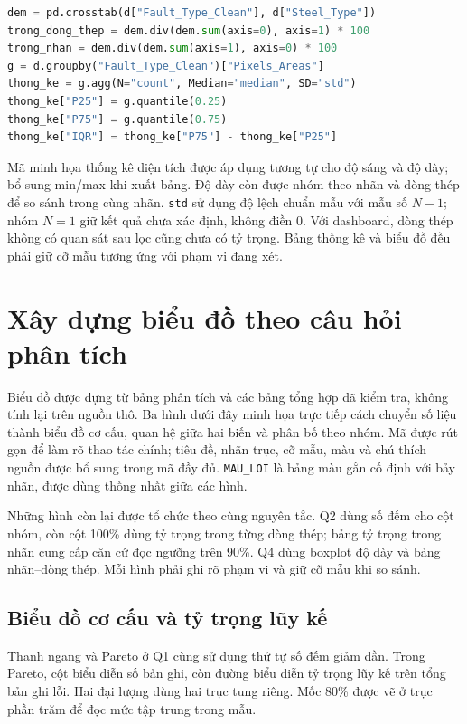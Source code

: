 \documentclass[12pt,a4paper,oneside]{report}
\newcommand{\maCot}[1]{{\urlstyle{tt}\def\UrlBreaks{\do\_\do\/\do\.}\def\UrlBigBreaks{}\nolinkurl{#1}}}
\begin{document}
\noindent\begin{minipage}{\linewidth}
\begin{lstlisting}[language=Python]
dem = pd.crosstab(d["Fault_Type_Clean"], d["Steel_Type"])
trong_dong_thep = dem.div(dem.sum(axis=0), axis=1) * 100
trong_nhan = dem.div(dem.sum(axis=1), axis=0) * 100
g = d.groupby("Fault_Type_Clean")["Pixels_Areas"]
thong_ke = g.agg(N="count", Median="median", SD="std")
thong_ke["P25"] = g.quantile(0.25)
thong_ke["P75"] = g.quantile(0.75)
thong_ke["IQR"] = thong_ke["P75"] - thong_ke["P25"]
\end{lstlisting}
\end{minipage}\par

Mã minh họa thống kê diện tích được áp dụng tương tự cho độ sáng và độ dày; bổ sung min/max khi xuất bảng. Độ dày còn được nhóm theo nhãn và dòng thép để so sánh trong cùng nhãn. \maCot{std} sử dụng độ lệch chuẩn mẫu với mẫu số $N-1$; nhóm $N=1$ giữ kết quả chưa xác định, không điền 0. Với dashboard, dòng thép không có quan sát sau lọc cũng chưa có tỷ trọng. Bảng thống kê và biểu đồ đều phải giữ cỡ mẫu tương ứng với phạm vi đang xét.

\section{Xây dựng biểu đồ theo câu hỏi phân tích}

Biểu đồ được dựng từ bảng phân tích và các bảng tổng hợp đã kiểm tra, không tính lại trên nguồn thô. Ba hình dưới đây minh họa trực tiếp cách chuyển số liệu thành biểu đồ cơ cấu, quan hệ giữa hai biến và phân bố theo nhóm. Mã được rút gọn để làm rõ thao tác chính; tiêu đề, nhãn trục, cỡ mẫu, màu và chú thích nguồn được bổ sung trong mã đầy đủ. \maCot{MAU_LOI} là bảng màu gắn cố định với bảy nhãn, được dùng thống nhất giữa các hình.

Những hình còn lại được tổ chức theo cùng nguyên tắc. Q2 dùng số đếm cho cột nhóm, còn cột 100\% dùng tỷ trọng trong từng dòng thép; bảng tỷ trọng trong nhãn cung cấp căn cứ đọc ngưỡng trên 90\%. Q4 dùng boxplot độ dày và bảng nhãn--dòng thép. Mỗi hình phải ghi rõ phạm vi và giữ cỡ mẫu khi so sánh.

\subsection{Biểu đồ cơ cấu và tỷ trọng lũy kế}

Thanh ngang và Pareto ở Q1 cùng sử dụng thứ tự số đếm giảm dần. Trong Pareto, cột biểu diễn số bản ghi, còn đường biểu diễn tỷ trọng lũy kế trên tổng bản ghi lỗi. Hai đại lượng dùng hai trục tung riêng. Mốc 80\% được vẽ ở trục phần trăm để đọc mức tập trung trong mẫu.
\end{document}
